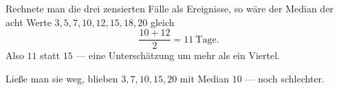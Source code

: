 \begin{aufgabe}
Rechnete man die drei zensierten Fälle als Ereignisse, so wäre der Median der acht Werte $3,5,7,10,12,15,18,20$ gleich
\[ \frac{10+12}{2} = 11 \ \text{Tage} . \]
Also $11$ statt $15$ --- eine Unterschätzung um mehr als ein Viertel.

Ließe man sie weg, blieben $3, 7, 10, 15, 20$ mit Median $10$ --- noch schlechter.

\begin{center}
\begin{minipage}{0.86\textwidth}
\end{minipage}
\end{center}
\end{aufgabe}

